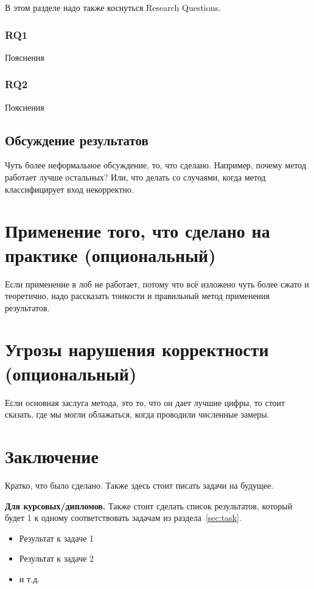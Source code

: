 В этом разделе надо также коснуться Research Questions.

\subsubsection{RQ1} Пояснения
\subsubsection{RQ2} Пояснения

\subsection{Обсуждение результатов}

Чуть более неформальное обсуждение, то, что сделано. Например, почему метод работает лучше остальных? Или, что делать со случаями, когда метод классифицирует вход некорректно.

\section{Применение того, что сделано на практике (опциональный)}

Если применение в лоб не работает, потому что всё изложено чуть более сжато и теоретично, надо рассказать тонкости и правильный метод применения результатов. 

\section{Угрозы нарушения корректности (опциональный)}

Если основная заслуга метода, это то, что он дает лучшие цифры, то стоит сказать, где мы могли облажаться, когда проводили численные замеры. 

\section{Заключение}

Кратко, что было сделано. Также здесь стоит писать задачи на будущее.

\textbf{Для курсовых/дипломов.} Также стоит сделать список результатов, который будет 1 к одному соответствовать задачам из раздела~\ref{sec:task}.

\begin{itemize}
\item Результат к задаче 1 
\item Результат к задаче 2
\item и т.д.
\end{itemize}



\setmonofont[Mapping=tex-text]{CMU Typewriter Text}



